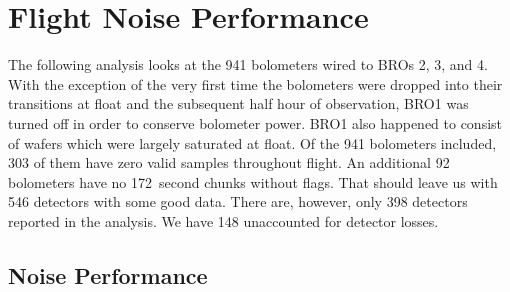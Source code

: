 %
%
\section{Flight Noise Performance}
\label{flight_noise_performance}

The following analysis looks at the 941 bolometers wired to \ac{BRO}s 2, 3, and 4. 
With the exception of the very first time the bolometers were dropped into their transitions at float and the subsequent half hour of observation, \ac{BRO}1 was turned off in order to conserve bolometer power. \ac{BRO}1 also happened to consist of wafers which were largely saturated at float. 
Of the 941 bolometers included, 303 of them have zero valid samples throughout flight. 
An additional 92 bolometers have no 172~second chunks without flags. 
That should leave us with 546 detectors with some good data. 
There are, however, only 398 detectors reported in the analysis. 
We have 148 unaccounted for detector losses. 

\subsection{Noise Performance}
\label{sec:noise_performance}


